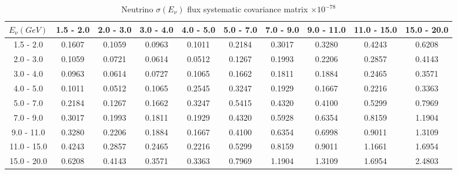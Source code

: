 \documentclass[aps,prl,twocolumn,showpacs,superscriptaddress,nofootinbib]{revtex4}
\begin{document}
\begingroup
\squeezetable
\begin{table}[h]
\tabcolsep=0.11cm
\begin{tabular}{c|ccccccccc}
$E_{\nu}(GeV)$ & 1.5 - 2.0 & 2.0 - 3.0 & 3.0 - 4.0 & 4.0 - 5.0 & 5.0 - 7.0 & 7.0 - 9.0 & 9.0 - 11.0 & 11.0 - 15.0 & 15.0 - 20.0\\
\hline
1.5 - 2.0 &0.1607	&0.1059	&0.0963	&0.1011	&0.2184	&0.3017	&0.3280	&0.4243	&0.6208\\	
2.0 - 3.0  &0.1059	&0.0721	&0.0614	&0.0512	&0.1267	&0.1993	&0.2206	&0.2857	&0.4143	\\
3.0 - 4.0 &0.0963	&0.0614	&0.0727	&0.1065	&0.1662	&0.1811	&0.1884	&0.2465	&0.3571	\\
4.0 - 5.0 &0.1011	&0.0512	&0.1065	&0.2545	&0.3247	&0.1929	&0.1667	&0.2216	&0.3363	\\
5.0 - 7.0 &0.2184	&0.1267	&0.1662	&0.3247	&0.5415	&0.4320	&0.4100	&0.5299	&0.7969	\\
 7.0 - 9.0 &0.3017	&0.1993	&0.1811	&0.1929	&0.4320	&0.5928	&0.6354	&0.8159	&1.1904	\\
9.0 - 11.0 &0.3280	&0.2206	&0.1884	&0.1667	&0.4100	&0.6354	&0.6998	&0.9011	&1.3109	\\
11.0 - 15.0 &0.4243	&0.2857	&0.2465	&0.2216	&0.5299	&0.8159	&0.9011	&1.1661	&1.6954	\\
15.0 - 20.0 &0.6208	&0.4143	&0.3571	&0.3363	&0.7969	&1.1904	&1.3109	&1.6954	&2.4803	\\
\end{tabular}
\caption{Neutrino $\sigma(E_\nu)$  flux systematic covariance matrix  $\times 10^{-78}$ }
\label{tab:enu-flux}
\end{table}
\endgroup
\end{document}

